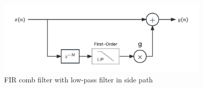 \documentclass[a4paper]{tufte-handout} %
\begin{document}
\begin{itemize}
    
    \begin{figure}[h]
    \centering
	\includegraphics[width=4in]{Image/SideChain.png}
	\caption{FIR comb filter with low-pass filter in side path}
	\label{fig:textfig}
    \end{figure}
    
\end{itemize}
\end{document}
